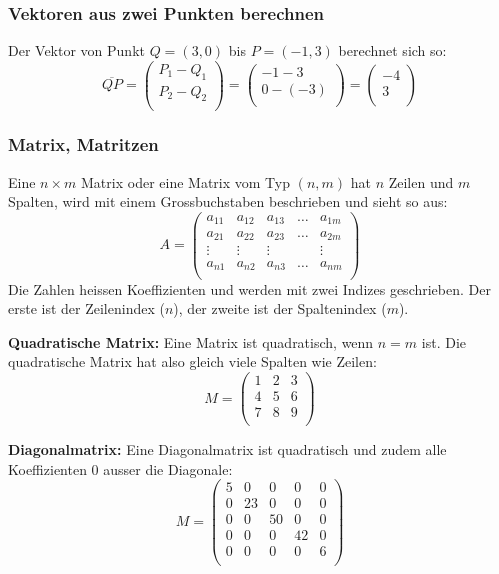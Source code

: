\subsubsection{Vektoren aus zwei Punkten berechnen}
Der Vektor von Punkt $Q = (3, 0)$ bis $P = (-1, 3)$ berechnet sich so:
\[ \overline{QP} = \begin {pmatrix} P_1 - Q_1 \\ P_2 - Q_2 \\ \end {pmatrix}
  = \begin {pmatrix} -1 - 3 \\ 0 - (-3) \\ \end {pmatrix}
  = \begin {pmatrix} -4 \\ 3 \\ \end {pmatrix} \]

\subsubsection{Matrix, Matritzen}
Eine $n \times m$ Matrix oder eine Matrix vom Typ $(n, m)$ hat $n$ Zeilen
und $m$ Spalten, wird mit einem Grossbuchstaben beschrieben und sieht so aus:
\[ A = \begin {pmatrix}
  a_{11} & a_{12} & a_{13} & \hdots & a_{1m} \\
  a_{21} & a_{22} & a_{23} & \hdots & a_{2m} \\
  \vdots  & \vdots  & \vdots  &        & \vdots  \\
  a_{n1} & a_{n2} & a_{n3} & \hdots & a_{nm} \\
\end {pmatrix} \]
Die Zahlen heissen Koeffizienten und werden mit zwei Indizes
geschrieben. Der erste ist der Zeilenindex ($n$), der zweite ist der
Spaltenindex ($m$).

\textbf{Quadratische Matrix:} Eine Matrix ist quadratisch, wenn $n = m$ ist.
Die quadratische Matrix hat also gleich viele Spalten wie Zeilen:
\[ M = \begin {pmatrix}
 1  & 2 & 3  \\
 4  & 5 & 6  \\
 7  & 8 & 9  \\
\end {pmatrix} \]


\textbf{Diagonalmatrix:} Eine Diagonalmatrix ist quadratisch und zudem
alle Koeffizienten $0$ ausser die Diagonale:
\[ M = \begin {pmatrix}
 5  & 0  & 0  & 0  & 0  \\
 0  & 23  & 0  & 0  & 0  \\
 0  & 0  & 50  & 0  & 0  \\
 0  & 0  & 0  & 42  & 0  \\
 0  & 0  & 0  & 0  & 6  \\
\end {pmatrix} \]

